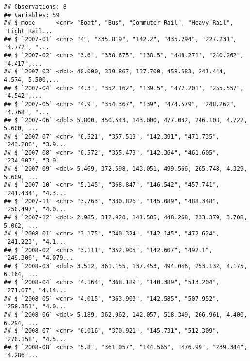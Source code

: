 \documentclass[]{article}
\newenvironment{Shaded}{\begin{snugshade}}{\end{snugshade}}
\newcommand{\CommentTok}[1]{\textcolor[rgb]{0.56,0.35,0.01}{\textit{#1}}}
\newcommand{\DecValTok}[1]{\textcolor[rgb]{0.00,0.00,0.81}{#1}}
\newcommand{\KeywordTok}[1]{\textcolor[rgb]{0.13,0.29,0.53}{\textbf{#1}}}
\newcommand{\NormalTok}[1]{#1}
\newcommand{\OperatorTok}[1]{\textcolor[rgb]{0.81,0.36,0.00}{\textbf{#1}}}
\newcommand{\StringTok}[1]{\textcolor[rgb]{0.31,0.60,0.02}{#1}}
\begin{document}
\begin{Shaded}
\end{Shaded}

\begin{verbatim}
## Observations: 8
## Variables: 59
## $ mode      <chr> "Boat", "Bus", "Commuter Rail", "Heavy Rail", "Light Rail...
## $ `2007-01` <chr> "4", "335.819", "142.2", "435.294", "227.231", "4.772", "...
## $ `2007-02` <chr> "3.6", "338.675", "138.5", "448.271", "240.262", "4.417",...
## $ `2007-03` <dbl> 40.000, 339.867, 137.700, 458.583, 241.444, 4.574, 5.500,...
## $ `2007-04` <chr> "4.3", "352.162", "139.5", "472.201", "255.557", "4.542",...
## $ `2007-05` <chr> "4.9", "354.367", "139", "474.579", "248.262", "4.768", "...
## $ `2007-06` <dbl> 5.800, 350.543, 143.000, 477.032, 246.108, 4.722, 5.600, ...
## $ `2007-07` <chr> "6.521", "357.519", "142.391", "471.735", "243.286", "3.9...
## $ `2007-08` <chr> "6.572", "355.479", "142.364", "461.605", "234.907", "3.9...
## $ `2007-09` <dbl> 5.469, 372.598, 143.051, 499.566, 265.748, 4.329, 5.609, ...
## $ `2007-10` <chr> "5.145", "368.847", "146.542", "457.741", "241.434", "4.3...
## $ `2007-11` <chr> "3.763", "330.826", "145.089", "488.348", "250.497", "4.0...
## $ `2007-12` <dbl> 2.985, 312.920, 141.585, 448.268, 233.379, 3.708, 5.062, ...
## $ `2008-01` <chr> "3.175", "340.324", "142.145", "472.624", "241.223", "4.1...
## $ `2008-02` <chr> "3.111", "352.905", "142.607", "492.1", "249.306", "4.079...
## $ `2008-03` <dbl> 3.512, 361.155, 137.453, 494.046, 253.132, 4.175, 6.164, ...
## $ `2008-04` <chr> "4.164", "368.189", "140.389", "513.204", "271.07", "4.14...
## $ `2008-05` <chr> "4.015", "363.903", "142.585", "507.952", "258.351", "4.0...
## $ `2008-06` <dbl> 5.189, 362.962, 142.057, 518.349, 266.961, 4.400, 6.294, ...
## $ `2008-07` <chr> "6.016", "370.921", "145.731", "512.309", "270.158", "4.5...
## $ `2008-08` <chr> "5.8", "361.057", "144.565", "476.99", "239.344", "4.286"...

\end{verbatim}
\end{document}
